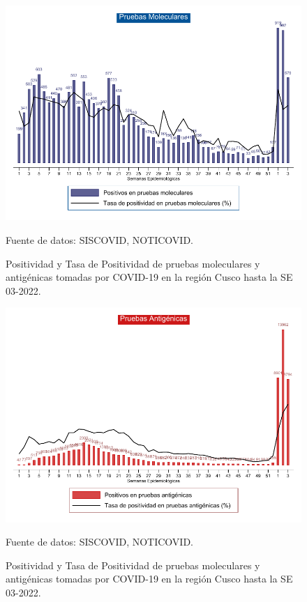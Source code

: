 \documentclass[12pt,a4paper,openany]{book}
\begin{document}
\begin{landscape}
	\begin{figure}[h]
		\caption{Positividad y Tasa de Positividad de pruebas moleculares y antigénicas tomadas por COVID-19 en la región Cusco hasta la SE 03-2022.}\label{fig:positividad_pcr}
		\begin{center}
			\includegraphics[width=0.85\linewidth]{../figuras/positividad_pcr.pdf}
		\end{center}
		{\footnotesize {Fuente de datos: SISCOVID, NOTICOVID.}}
	\end{figure}
\end{landscape}
\clearpage

\begin{landscape}
	\begin{figure}[h]
		\caption{Positividad y Tasa de Positividad de pruebas moleculares y antigénicas tomadas por COVID-19 en la región Cusco hasta la SE 03-2022.}\label{fig:positividad_ag}
		\begin{center}
			\includegraphics[width=0.85\linewidth]{../figuras/positividad_ag.pdf}
		\end{center}
		{\footnotesize {Fuente de datos: SISCOVID, NOTICOVID.}}
	\end{figure}
\end{landscape}
\clearpage
\end{document}
